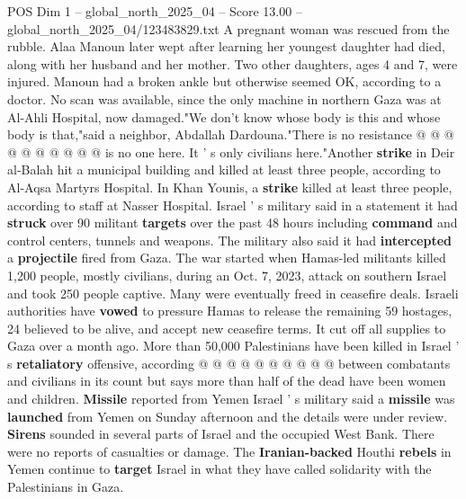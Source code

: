 \begin{textsample}{POS Dim 1 – global\_north\_2025\_04 – Score 13.00 – global\_north\_2025\_04/123483829.txt}
A pregnant woman was rescued from the rubble.
Alaa Manoun later wept after learning her youngest daughter had died, along with her husband and her mother.
Two other daughters, ages 4 and 7, were injured.
Manoun had a broken ankle but otherwise seemed OK, according to a doctor.
No scan was available, since the only machine in northern Gaza was at Al-Ahli Hospital, now damaged."We don't know whose body is this and whose body is that,"said a neighbor, Abdallah Dardouna."There is no resistance @ @ @ @ @ @ @ @ @ @ is no one here.
It ' s only civilians here."Another \textbf{strike} in Deir al-Balah hit a municipal building and killed at least three people, according to Al-Aqsa Martyrs Hospital.
In Khan Younis, a \textbf{strike} killed at least three people, according to staff at Nasser Hospital.
Israel ' s military said in a statement it had \textbf{struck} over 90 militant \textbf{targets} over the past 48 hours including \textbf{command} and control centers, tunnels and weapons.
The military also said it had \textbf{intercepted} a \textbf{projectile} fired from Gaza.
The war started when Hamas-led militants killed 1,200 people, mostly civilians, during an Oct. 7, 2023, attack on southern Israel and took 250 people captive.
Many were eventually freed in ceasefire deals.
Israeli authorities have \textbf{vowed} to pressure Hamas to release the remaining 59 hostages, 24 believed to be alive, and accept new ceasefire terms.
It cut off all supplies to Gaza over a month ago.
More than 50,000 Palestinians have been killed in Israel ' s \textbf{retaliatory} offensive, according @ @ @ @ @ @ @ @ @ @ between combatants and civilians in its count but says more than half of the dead have been women and children. \textbf{Missile} reported from Yemen Israel ' s military said a \textbf{missile} was \textbf{launched} from Yemen on Sunday afternoon and the details were under review. \textbf{Sirens} sounded in several parts of Israel and the occupied West Bank.
There were no reports of casualties or damage.
The \textbf{Iranian-backed} Houthi \textbf{rebels} in Yemen continue to \textbf{target} Israel in what they have called solidarity with the Palestinians in Gaza.

\end{textsample}
